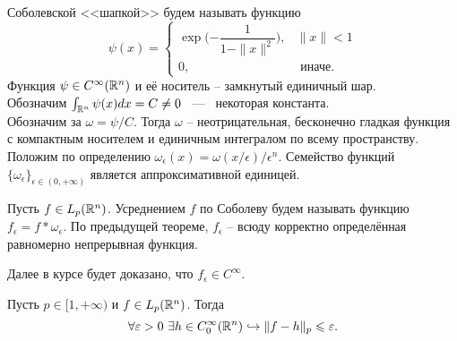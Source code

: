 \begin{example}
    Соболевской <<шапкой>> будем называть функцию
    \[
        \psi(x) = \begin{cases}
                      \exp\biggr({-\dfrac{1}{1 - \|x\|^2}}\biggr), & \|x\| < 1 \\
                      0, & \text{ иначе.}
        \end{cases}
    \]
    Функция $\psi \in C^{\infty}(\mathbb{R}^n)$ и её носитель -- замкнутый единичный шар. \\
    Обозначим $\int_{\mathbb{R}^n} \psi(x)dx = C \neq 0$ ~---~ некоторая константа. \\
    Обозначим за $\omega = \psi/C$.
    Тогда $\omega$ -- неотрицательная, бесконечно гладкая функция с компактным носителем и единичным интегралом по всему пространству. \\
    Положим по определению $\omega_\epsilon(x) = \omega(x/\epsilon)/\epsilon^n$.
    Семейство функций $\{\omega_\epsilon\}_{\epsilon \in (0, +\infty)}$ является аппроксимативной единицей.
\end{example}
\begin{corollary}
    Пусть $f \in L_p(\mathbb{R}^n)$.
    Усреднением $f$ по Соболеву будем называть функцию $f_\epsilon = f * \omega_\epsilon$.
    По предыдущей теореме, $f_\epsilon$ -- всюду корректно определённая равномерно непрерывная функция.
\end{corollary}
\begin{note}
    Далее в курсе будет доказано, что $f_\epsilon \in C^{\infty}$.
\end{note}
\begin{theorem}
    Пусть $p \in [1, +\infty)$ и $f \in L_p(\mathbb{R}^n)$. Тогда
    \[
        \forall \varepsilon > 0  \ \exists h \in C^{\infty}_0(\mathbb{R}^n) \hookrightarrow \|f - h\|_p \leqslant \varepsilon.
    \]
\end{theorem}

